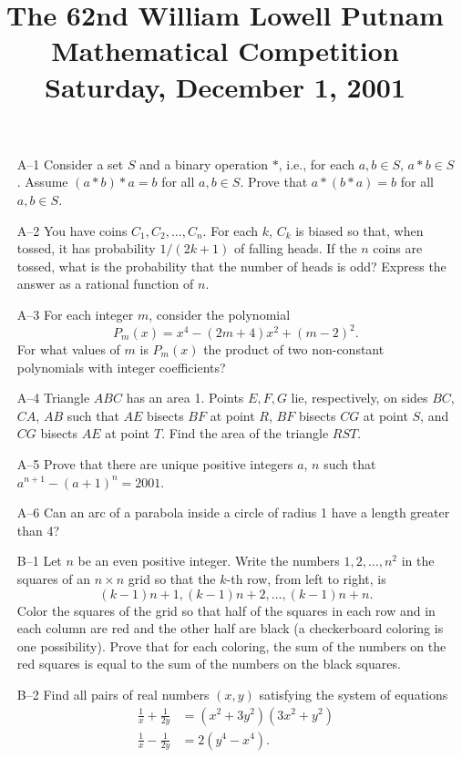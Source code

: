 \documentclass[amssymb,twocolumn,pra,10pt,aps]{revtex4-1}
\begin{document}
\title{The 62nd William Lowell Putnam Mathematical Competition \\
    Saturday, December 1, 2001}
\maketitle

\begin{itemize}
\item[A--1]
Consider a set $S$ and a binary operation $*$, i.e., for each $a,b\in S$,
$a*b\in S$.  Assume $(a*b)*a=b$ for all $a,b\in S$.  Prove that
$a*(b*a)=b$ for all $a,b\in S$.

\item[A--2]
You have coins $C_1,C_2,\ldots,C_n$.  For each $k$, $C_k$ is biased so
that, when tossed, it has probability $1/(2k+1)$ of falling heads.
If the $n$ coins are tossed, what is the probability that the number of
heads is odd?  Express the answer as a rational function of $n$.

\item[A--3]
For each integer $m$, consider the polynomial
\[P_m(x)=x^4-(2m+4)x^2+(m-2)^2.\] For what values of $m$ is $P_m(x)$
the product of two non-constant polynomials with integer coefficients?

\item[A--4]
Triangle $ABC$ has an area 1.  Points $E,F,G$ lie, respectively,
on sides $BC$, $CA$, $AB$ such that $AE$ bisects $BF$ at point $R$,
$BF$ bisects $CG$ at point $S$, and $CG$ bisects $AE$ at point $T$.
Find the area of the triangle $RST$.

\item[A--5]
Prove that there are unique positive integers $a$, $n$ such that
$a^{n+1}-(a+1)^n=2001$.

\item[A--6]
Can an arc of a parabola inside a circle of radius 1 have a length
greater than 4?

\item[B--1]
Let $n$ be an even positive integer.  Write the numbers
$1,2,\ldots,n^2$ in the squares of an $n\times n$ grid so that the
$k$-th row, from left to right, is
\[(k-1)n+1,(k-1)n+2,\ldots, (k-1)n+n.\]
Color the squares of the grid so that half of the squares in each
row and in each column are red and the other half are black (a
checkerboard coloring is one possibility).  Prove that for each
coloring, the sum of the numbers on the red squares is equal to
the sum of the numbers on the black squares.

\item[B--2]
Find all pairs of real numbers $(x,y)$ satisfying the system
of equations
\begin{align*}
 \frac{1}{x} + \frac{1}{2y} &= (x^2+3y^2)(3x^2+y^2) \\
   \frac{1}{x} - \frac{1}{2y} &= 2(y^4-x^4).
\end{align*}


\end{itemize}
\end{document}
